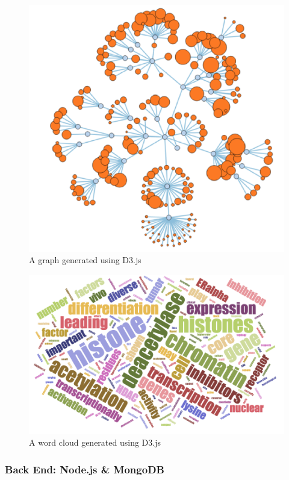 \documentclass[12pt]{article}
\begin{document}
\begin{figure}[h]
\centering
\includegraphics[scale=0.5]{img/d3_graph_example}
\caption{A graph generated using D3.js}
\label{fig:d3_graph_example}
\end{figure}

\begin{figure}[h]
\centering
\includegraphics[scale=0.5]{img/d3_word_cloud_example}
\caption{A word cloud generated using D3.js}
\label{fig:d3_word_cloud_example}
\end{figure}

\subsubsection{Back End: Node.js \& MongoDB}
\end{document}
